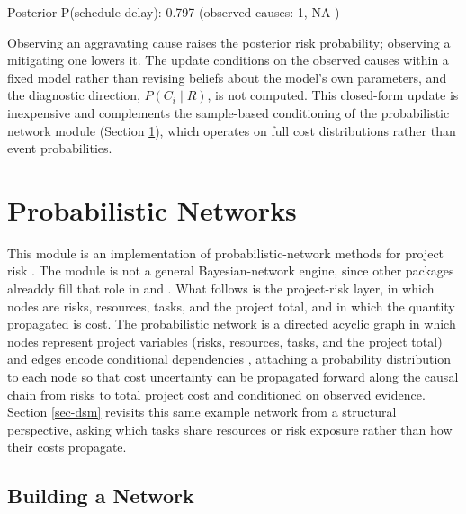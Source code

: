 \documentclass[
]{jss}
\begin{document}
\begin{CodeChunk}
\begin{CodeOutput}
Posterior P(schedule delay): 0.797  (observed causes: 1, NA )
\end{CodeOutput}
\end{CodeChunk}

Observing an aggravating cause raises the posterior risk probability;
observing a mitigating one lowers it. The update conditions on the
observed causes within a fixed model rather than revising beliefs about
the model's own parameters, and the diagnostic direction,
\(P(C_i \mid R)\), is not computed. This closed-form update is
inexpensive and complements the sample-based conditioning of the
probabilistic network module (Section \ref{sec-network}), which operates
on full cost distributions rather than event probabilities.

\section{Probabilistic Networks}\label{sec-network}

This module is an implementation of probabilistic-network methods for
project risk \citep{Govan2014, Govan2016, Govan2020}. The module is not
a general Bayesian-network engine, since other packages alreaddy fill
that role in   and . What follows is
the project-risk layer, in which nodes are risks, resources, tasks, and
the project total, and in which the quantity propagated is cost. The
probabilistic network is a directed acyclic graph in which nodes
represent project variables (risks, resources, tasks, and the project
total) and edges encode conditional dependencies \citep{Pearl2009},
attaching a probability distribution to each node so that cost
uncertainty can be propagated forward along the causal chain from risks
to total project cost and conditioned on observed evidence. Section
\ref{sec-dsm} revisits this same example network from a structural
perspective, asking which tasks share resources or risk exposure rather
than how their costs propagate.

\subsection{Building a Network}\label{building-a-network}
\end{document}

